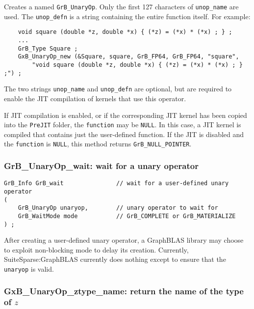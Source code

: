 \documentclass[12pt]{article}
\begin{document}
Creates a named \verb'GrB_UnaryOp'.  Only the first 127 characters of
\verb'unop_name' are used.  The \verb'unop_defn' is a string containing the
entire function itself.  For example:

    {\footnotesize
    \begin{verbatim}
    void square (double *z, double *x) { (*z) = (*x) * (*x) ; } ;
    ...
    GrB_Type Square ;
    GxB_UnaryOp_new (&Square, square, GrB_FP64, GrB_FP64, "square",
        "void square (double *z, double *x) { (*z) = (*x) * (*x) ; } ;") ;
    \end{verbatim}}

The two strings \verb'unop_name' and \verb'unop_defn' are optional, but are
required to enable the JIT compilation of kernels that use this operator.

If JIT compilation is enabled, or if the corresponding JIT kernel has been
copied into the \verb'PreJIT' folder, the \verb'function' may be \verb'NULL'.
In this case, a JIT kernel is compiled that contains just the user-defined
function.  If the JIT is disabled and the \verb'function' is \verb'NULL', this
method returns \verb'GrB_NULL_POINTER'.

\subsubsection{{\sf GrB\_UnaryOp\_wait:} wait for a unary operator}
\label{unaryop_wait}

\begin{mdframed}[userdefinedwidth=6in]
{\footnotesize
\begin{verbatim}
GrB_Info GrB_wait               // wait for a user-defined unary operator
(
    GrB_UnaryOp unaryop,        // unary operator to wait for
    GrB_WaitMode mode           // GrB_COMPLETE or GrB_MATERIALIZE
) ;
\end{verbatim}
}\end{mdframed}

After creating a user-defined unary operator, a GraphBLAS library may choose to
exploit non-blocking mode to delay its creation.  Currently,
SuiteSparse:GraphBLAS currently does nothing except to ensure that the
\verb'unaryop' is valid.

\newpage
\subsubsection{{\sf GxB\_UnaryOp\_ztype\_name:} return the name of the type of $z$}
\label{unaryop_ztype_name}
\end{document}

